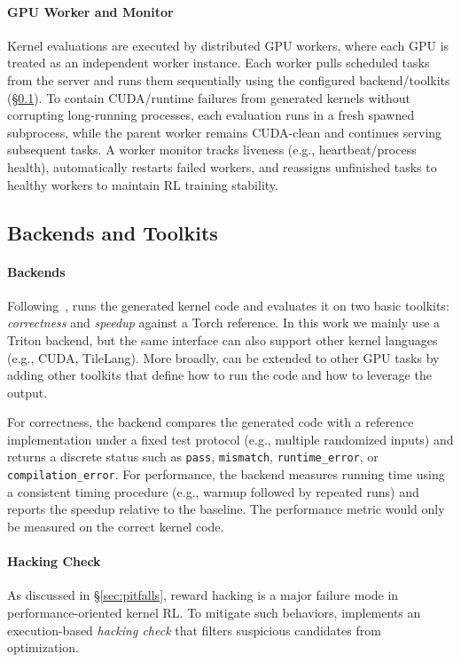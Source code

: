 \paragraph{GPU Worker and Monitor} Kernel evaluations are executed by distributed GPU workers, where each GPU is treated as an independent worker instance. Each worker pulls scheduled tasks from the server and runs them sequentially using the configured backend/toolkits (\S\ref{sec:kernelgym:toolkits}). To contain CUDA/runtime failures from generated kernels without corrupting long-running processes, each evaluation runs in a fresh spawned subprocess, while the parent worker remains CUDA-clean and continues serving subsequent tasks. A worker monitor tracks liveness (e.g., heartbeat/process health), automatically restarts failed workers, and reassigns unfinished tasks to healthy workers to maintain RL training stability.

\subsection{Backends and Toolkits}
\label{sec:kernelgym:toolkits}

\paragraph{Backends}
Following~\citet{ouyang2025kernelbench}, \env{} runs the generated kernel code and evaluates it on two basic toolkits: \emph{correctness} and \emph{speedup} against a Torch reference.
In this work we mainly use a Triton backend, but the same interface can also support other kernel languages (e.g., CUDA, TileLang).
More broadly, \env{} can be extended to other GPU tasks by adding other toolkits that define how to run the code and how to leverage the output.

For correctness, the backend compares the generated code with a reference implementation under a fixed test protocol (e.g., multiple randomized inputs) and returns a discrete status such as \texttt{pass}, \texttt{mismatch}, \texttt{runtime\_error}, or \texttt{compilation\_error}.
For performance, the backend measures running time using a consistent timing procedure (e.g., warmup followed by repeated runs) and reports the speedup relative to the baseline. The performance metric would only be measured on the correct kernel code.

\paragraph{Hacking Check}
 As discussed in \S\ref{sec:pitfalls}, reward hacking is a major failure mode in performance-oriented kernel RL. To mitigate such behaviors, \env{} implements an execution-based \emph{hacking check} that filters suspicious candidates from optimization.


